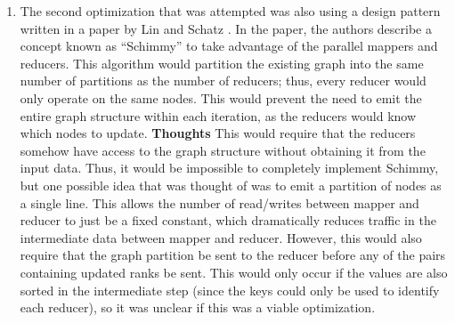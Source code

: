 \documentclass{article}
\begin{document}
\begin{enumerate}
\item The second optimization that was attempted was also using a design pattern
written in a paper by Lin and Schatz \cite{lin2010design}. In the paper, the authors
describe a concept known as ``Schimmy'' to take advantage of the parallel mappers and reducers. 
This algorithm would partition the existing graph into the same number of partitions 
as the number of reducers; thus, every reducer would only operate on the same nodes. 
This would prevent the need to emit the entire graph structure within each iteration,
as the reducers would know which nodes to update.
    \subitem \textbf{Thoughts} This would require that the reducers somehow have
    access to the graph structure without obtaining it from the input data. Thus, 
    it would be impossible to completely implement Schimmy, but one possible idea 
    that was thought of was to emit a partition of nodes as a single line. This 
    allows the number of read/writes between mapper and reducer to just be a fixed
    constant, which dramatically reduces traffic in the intermediate data between
    mapper and reducer. However, this would also require that the graph
    partition be sent to the reducer before any of the pairs containing updated ranks
    be sent. This would only occur if the values are also sorted in the intermediate step
    (since the keys could only be used to identify each reducer), so it
    was unclear if this was a viable optimization.
\end{enumerate}

\printbibliography


\end{document}
